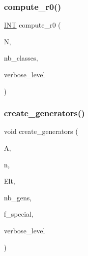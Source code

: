 \mbox{\label{burnside_8_c_acf24b8619244160b63b3af621a07a877}} 
\subsubsection{\texorpdfstring{compute\+\_\+r0()}{compute\_r0()}}
{\footnotesize\ttfamily \mbox{\hyperlink{galois_8h_a09fddde158a3a20bd2dcadb609de11dc}{I\+NT}} compute\+\_\+r0 (\begin{DoxyParamCaption}\item[{\mbox{\hyperlink{galois_8h_a09fddde158a3a20bd2dcadb609de11dc}{I\+NT}} $\ast$}]{N,  }\item[{\mbox{\hyperlink{galois_8h_a09fddde158a3a20bd2dcadb609de11dc}{I\+NT}}}]{nb\+\_\+classes,  }\item[{\mbox{\hyperlink{galois_8h_a09fddde158a3a20bd2dcadb609de11dc}{I\+NT}}}]{verbose\+\_\+level }\end{DoxyParamCaption})}

\mbox{\label{burnside_8_c_a66d9cd8340d5f12650b3ebd662687269}} 
\subsubsection{\texorpdfstring{create\+\_\+generators()}{create\_generators()}}
{\footnotesize\ttfamily void create\+\_\+generators (\begin{DoxyParamCaption}\item[{\mbox{\hyperlink{classaction}{action}} $\ast$}]{A,  }\item[{\mbox{\hyperlink{galois_8h_a09fddde158a3a20bd2dcadb609de11dc}{I\+NT}}}]{n,  }\item[{\mbox{\hyperlink{galois_8h_a09fddde158a3a20bd2dcadb609de11dc}{I\+NT}} $\ast$$\ast$\&}]{Elt,  }\item[{\mbox{\hyperlink{galois_8h_a09fddde158a3a20bd2dcadb609de11dc}{I\+NT}} \&}]{nb\+\_\+gens,  }\item[{\mbox{\hyperlink{galois_8h_a09fddde158a3a20bd2dcadb609de11dc}{I\+NT}}}]{f\+\_\+special,  }\item[{\mbox{\hyperlink{galois_8h_a09fddde158a3a20bd2dcadb609de11dc}{I\+NT}}}]{verbose\+\_\+level }\end{DoxyParamCaption})}

